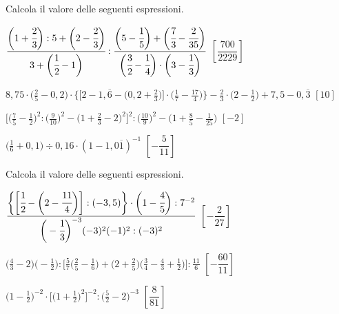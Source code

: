 \begin{esercizio}[\Ast]
\label{ese:3.152}
 Calcola il valore delle seguenti espressioni.
\begin{enumeratea}
\spazielenx
\item \(\displaystyle{\cfrac{\bigg(1+\cfrac{2}{3}\bigg):5+\bigg(2-
\cfrac{2}{3}\bigg)}{3+\bigg(\cfrac{1}{2}-1\bigg)}:
\frac{\bigg(5-\cfrac{1}{5}\bigg)+\bigg(\cfrac{7}{3}-\cfrac{2}{35}\bigg)}
{\bigg(\cfrac{3}{2}-\cfrac{1}{4}\bigg)\cdot
\bigg(3-\cfrac{1}{3}\bigg)}}\)
  \hfill \(\left[\dfrac{700}{2229} \right]\)
\item \(\displaystyle{8,75\cdot\bigg(\frac{2}{5}-0,2\bigg)\cdot
\bigg\{\bigg[2-1,\overline{6}-\bigg(0,2+\frac{2}{3}\bigg)\bigg]
\cdot\bigg(\frac{1}{7}-\frac{17}{4}\bigg)\bigg\}-\frac{2}{3}\cdot
\bigg(2-\frac{1}{2}\bigg)+7,5-0,\overline{3}}\)
  \hfill \(\left[10 \right]\)
\item \(\displaystyle{\bigg[\bigg(\frac{7}{5}-\frac{1}{2}\bigg)^{2}:
\bigg(\frac{9}{10}\bigg)^{2}-
\bigg(1+\frac{2}{3}-2\bigg)^{2}\bigg]^{2}:\bigg(\frac{10}{9}\bigg)^{2}-
\bigg(1+\frac{8}{5}-\frac{1}{25}\bigg)}\)
  \hfill \(\left[-2 \right]\)
\item \(\displaystyle{\bigg(\frac{1}{6}+0,1\bigg)\div 0,16\cdot
(1-1,0\overline{1})^{-1}}\)
  \hfill \(\left[-\dfrac{5}{11} \right]\)
\end{enumeratea}
\end{esercizio}

\begin{esercizio}[\Ast]
\label{ese:3.153}
 Calcola il valore delle seguenti espressioni.
\begin{enumeratea}
\spazielenx
\item \(\displaystyle{\frac{\bigg\{\bigg[\cfrac{1}{2}-\bigg(2-
\cfrac{11}{4}\bigg)\bigg]:(-3,5)\bigg\}\cdot
\bigg(1-\cfrac{4}{5}\bigg):7^{-2}}{\bigg(-{\cfrac{1}{3}}
\bigg)^{-3}(-3)^{2}(-1)^{2}:(-3)^{2}}}\)
  \hfill \(\left[-\dfrac{2}{27} \right]\)
\item \(\displaystyle{\bigg(\frac{4}{3}-2\bigg)\bigg(-{\frac{1}{2}}\bigg):
\bigg[\frac{5}{7}\bigg(\frac{2}{5}-\frac{1}{6}\bigg)
+\bigg(2+\frac{2}{5}\bigg)\bigg(\frac{3}{4}-\frac{4}{3}+
\frac{1}{2}\bigg)\bigg]:\frac{11}{6}}\)
  \hfill \(\left[-\dfrac{60}{11} \right]\)
\item \(\displaystyle{\bigg(1-\frac{1}{2}\bigg)^{-2}\cdot
\bigg[\bigg(1+\frac{1}{2}\bigg)^{2}\bigg]^{-2}:\bigg(\frac{5}{2}-2
\bigg)^{-3}}\)
  \hfill \(\left[\dfrac{8}{81} \right]\)
\end{enumeratea}
\end{esercizio}


